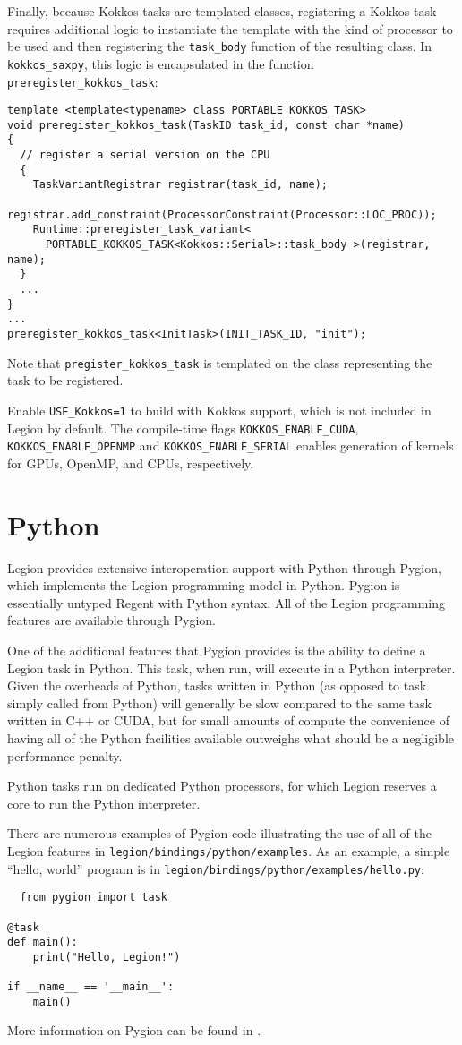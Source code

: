 Finally, because Kokkos tasks are templated classes, registering a Kokkos task requires additional logic to instantiate the template with the kind of processor to be used and then registering the
{\tt task\_body} function of the resulting class.  In {\tt kokkos\_saxpy}, this logic is encapsulated in the function {\tt preregister\_kokkos\_task}:
\begin{lstlisting}
template <template<typename> class PORTABLE_KOKKOS_TASK>
void preregister_kokkos_task(TaskID task_id, const char *name)
{
  // register a serial version on the CPU
  {
    TaskVariantRegistrar registrar(task_id, name);
    registrar.add_constraint(ProcessorConstraint(Processor::LOC_PROC));
    Runtime::preregister_task_variant<
      PORTABLE_KOKKOS_TASK<Kokkos::Serial>::task_body >(registrar, name);
  }
  ...
}
...
preregister_kokkos_task<InitTask>(INIT_TASK_ID, "init");  
\end{lstlisting}
Note that {\tt pregister\_kokkos\_task} is templated on the class representing the task to be registered.

Enable {\tt USE\_Kokkos=1} to build with Kokkos support, which is not included in Legion by default.
The compile-time flags {\tt KOKKOS\_ENABLE\_CUDA}, {\tt KOKKOS\_ENABLE\_OPENMP} and {\tt KOKKOS\_ENABLE\_SERIAL} enables
generation of kernels for GPUs, OpenMP, and CPUs, respectively.

\section{Python}
\label{sec:python}

Legion provides extensive interoperation support with Python through Pygion, which implements the Legion programming model
in Python.  Pygion is essentially untyped Regent with Python syntax.  All of the Legion programming features are available
through Pygion.

One of the additional features that Pygion provides is the ability to define a Legion task in Python.  This task, when run,
will execute in a Python interpreter.  Given the overheads of Python, tasks written in Python (as opposed to task simply
called from Python) will generally be slow compared to the same task written in C++ or CUDA, but for small amounts of compute
the convenience of having all of the Python facilities available outweighs what should be a negligible performance penalty.

Python tasks run on dedicated Python processors, for which Legion reserves a core to run
the Python interpreter.

There are numerous examples of Pygion code illustrating the use of all of the Legion features in
{\tt legion/bindings/python/examples}.  As an example, a simple ``hello, world'' program is in
{\tt legion/bindings/python/examples/hello.py}:
\begin{lstlisting}
  from pygion import task

@task
def main():
    print("Hello, Legion!")

if __name__ == '__main__':
    main()
\end{lstlisting}
More information on Pygion can be found in \cite{pygion19}.

